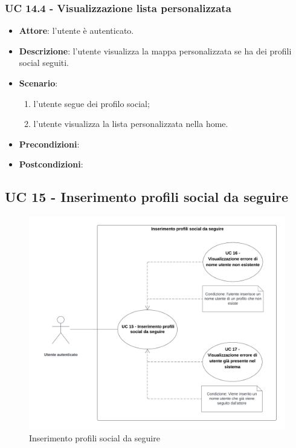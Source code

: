 \subsubsection{UC 14.4 - Visualizzazione lista personalizzata}
\begin{itemize}
    \item \textbf{Attore}: l'utente è autenticato.
    \item \textbf{Descrizione}: l'utente visualizza la mappa personalizzata se ha dei profili social seguiti.
    \item \textbf{Scenario}:
    \begin{enumerate}
        \item l'utente segue dei profilo social;
        \item l'utente visualizza la lista personalizzata nella home.
    \end{enumerate}

    \item \textbf{Precondizioni}: %
    \item \textbf{Postcondizioni}: %
\end{itemize}

\subsection{UC 15 - Inserimento profili social da seguire}
\begin{figure}[!h]
    \includegraphics[width=15cm]{sezioni/Images/UC15.png}
    \centering
    \caption{Inserimento profili social da seguire}
\end{figure}

